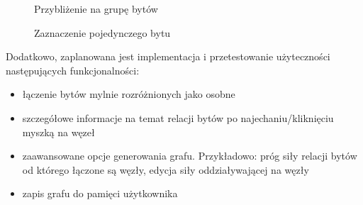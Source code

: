 \documentclass[12pt,a4paper]{article} %
\begin{document}
\begin{figure}[h]
\caption{Przybliżenie na grupę bytów}
\label{fig:zoom}
\centering
\end{figure}

\begin{figure}[h]
\caption{Zaznaczenie pojedynczego bytu}
\label{fig:highlight}
\centering
\end{figure}

Dodatkowo, zaplanowana jest implementacja i przetestowanie użyteczności następujących funkcjonalności:

\begin{itemize}
    \item łączenie bytów mylnie rozróżnionych jako osobne
    \item szczegółowe informacje na temat relacji bytów po najechaniu/kliknięciu myszką na węzeł
    \item zaawansowane opcje generowania grafu. Przykładowo: próg siły relacji bytów od którego łączone są węzły, edycja siły oddziaływającej na węzły
    \item zapis grafu do pamięci użytkownika
\end{itemize}

\newpage
\end{document}
